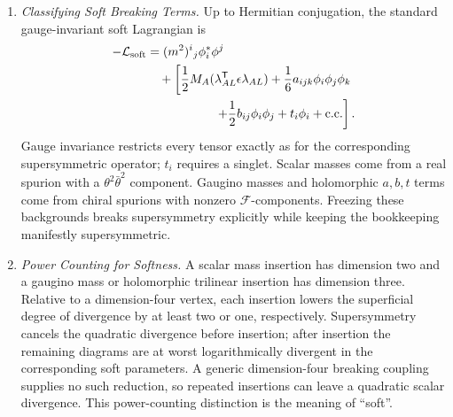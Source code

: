 \begin{enumerate}
  \begin{enumerate}
    \item \emph{Classifying Soft Breaking Terms.}
    Up to Hermitian conjugation, the standard gauge-invariant soft
      Lagrangian is
      \[
        \begin{aligned}
          -\mathcal L_{\rm soft}
            &=(m^2)^i{}_j\phi_i^*\phi^j\\
            &\quad+\left[
              \frac12M_A(\lambda_{AL}^{\mathsf T}\epsilon\lambda_{AL})
              +\frac16a_{ijk}\phi_i\phi_j\phi_k \right.\\
            &\hspace{5.5em}\left.
              +\frac12b_{ij}\phi_i\phi_j+t_i\phi_i
              +\mathrm{c.c.}\right].
        \end{aligned}
      \]
      Gauge invariance restricts every tensor exactly as for the corresponding
      supersymmetric operator; \(t_i\) requires a singlet.  Scalar masses come
      from a real spurion with a \(\theta^2\bar\theta^2\) component.  Gaugino
      masses and holomorphic \(a,b,t\) terms come from chiral spurions with
      nonzero \(\mathcal F\)-components.  Freezing these backgrounds breaks
      supersymmetry explicitly while keeping the bookkeeping manifestly
      supersymmetric.
    \item \emph{Power Counting for Softness.}
    A scalar mass insertion has dimension two and a gaugino mass or
      holomorphic trilinear insertion has dimension three.  Relative to a
      dimension-four vertex, each insertion lowers the superficial degree of
      divergence by at least two or one, respectively.  Supersymmetry cancels
      the quadratic divergence before insertion; after insertion the remaining
      diagrams are at worst logarithmically divergent in the corresponding
      soft parameters.  A generic dimension-four breaking coupling supplies
      no such reduction, so repeated insertions can leave a quadratic scalar
      divergence.  This power-counting distinction is the meaning of
      ``soft''.
  \end{enumerate}


\end{enumerate}
